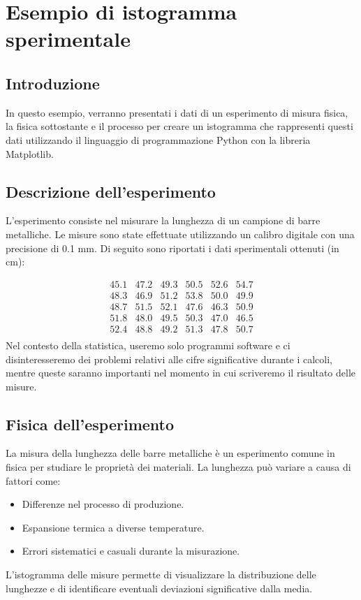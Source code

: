 \documentclass[a4paper,12pt]{article}
\begin{document}
\section{Esempio di istogramma sperimentale}

\subsection{Introduzione}
In questo esempio, verranno presentati i dati di un esperimento di misura fisica, la fisica sottostante e il processo per creare un istogramma che rappresenti questi dati utilizzando il linguaggio di programmazione Python con la libreria Matplotlib.

\subsection{Descrizione dell'esperimento}
L'esperimento consiste nel misurare la lunghezza di un campione di barre metalliche. Le misure sono state effettuate utilizzando un calibro digitale con una precisione di 0.1 mm. Di seguito sono riportati i dati sperimentali ottenuti (in cm):

\[
\begin{array}{cccccc}
45.1 & 47.2 & 49.3 & 50.5 & 52.6 & 54.7 \\
48.3 & 46.9 & 51.2 & 53.8 & 50.0 & 49.9 \\
48.7 & 51.5 & 52.1 & 47.6 & 46.3 & 50.9 \\
51.8 & 48.0 & 49.5 & 50.3 & 47.0 & 46.5 \\
52.4 & 48.8 & 49.2 & 51.3 & 47.8 & 50.7 \\
\end{array}
\]
Nel contesto della statistica, useremo solo programmi software e ci disinteresseremo dei problemi relativi alle cifre significative durante i calcoli, mentre queste saranno importanti nel momento in cui scriveremo il risultato delle misure.
\subsection{Fisica dell'esperimento}
La misura della lunghezza delle barre metalliche è un esperimento comune in fisica per studiare le proprietà dei materiali. La lunghezza può variare a causa di fattori come:
\begin{itemize}
    \item Differenze nel processo di produzione.
    \item Espansione termica a diverse temperature.
    \item Errori sistematici e casuali durante la misurazione.
\end{itemize}
L'istogramma delle misure permette di visualizzare la distribuzione delle lunghezze e di identificare eventuali deviazioni significative dalla media.
\end{document}

